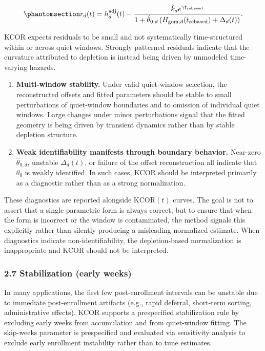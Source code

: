 \documentclass[
]{article}
\begin{document}
\begin{equation}\protect\phantomsection\label{eq:si_residuals}{
r_{d}(t)=h_d^{\mathrm{adj}}(t)-\frac{\hat{k}_d e^{\gamma t_{\mathrm{rebased}}}}{1+\hat{\theta}_{0,d}\left(H_{\mathrm{gom},d}(t_{\mathrm{rebased}})+\Delta_d(t)\right)}.
}\end{equation}

KCOR expects residuals to be small and not systematically
time-structured within or across quiet windows. Strongly patterned
residuals indicate that the curvature attributed to depletion is instead
being driven by unmodeled time-varying hazards.

\begin{enumerate}
\def\labelenumi{\arabic{enumi}.}
\setcounter{enumi}{2}
\item
  \textbf{Multi-window stability.} Under valid quiet-window selection,
  the reconstructed offsets and fitted parameters should be stable to
  small perturbations of quiet-window boundaries and to omission of
  individual quiet windows. Large changes under minor perturbations
  signal that the fitted geometry is being driven by transient dynamics
  rather than by stable depletion structure.
\item
  \textbf{Weak identifiability manifests through boundary behavior.}
  Near-zero \(\hat{\theta}_{0,d}\), unstable \(\Delta_d(t)\), or failure
  of the offset reconstruction all indicate that \(\theta_0\) is weakly
  identified. In such cases, KCOR should be interpreted primarily as a
  diagnostic rather than as a strong normalization.
\end{enumerate}

These diagnostics are reported alongside \(\mathrm{KCOR}(t)\) curves.
The goal is not to assert that a single parametric form is always
correct, but to ensure that when the form is incorrect or the window is
contaminated, the method signals this explicitly rather than silently
producing a misleading normalized estimate. When diagnostics indicate
non-identifiability, the depletion-based normalization is inappropriate
and KCOR should not be interpreted.

\subsubsection{2.7 Stabilization (early
weeks)}\label{stabilization-early-weeks}

In many applications, the first few post-enrollment intervals can be
unstable due to immediate post-enrollment artifacts (e.g., rapid
deferral, short-term sorting, administrative effects). KCOR supports a
prespecified stabilization rule by excluding early weeks from
accumulation and from quiet-window fitting. The skip-weeks parameter is
prespecified and evaluated via sensitivity analysis to exclude early
enrollment instability rather than to tune estimates.
\end{document}
